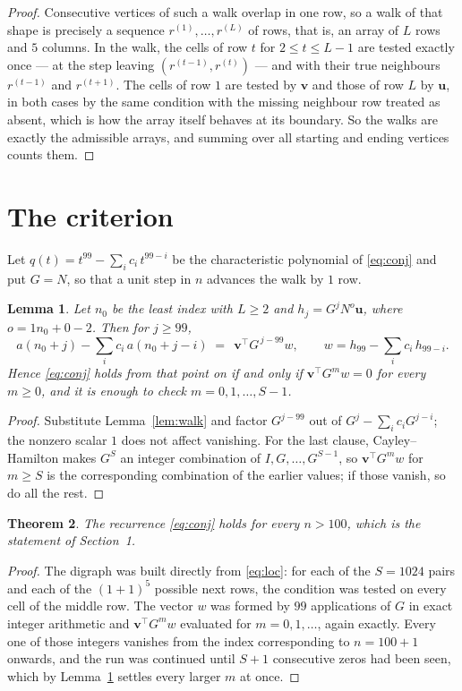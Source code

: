 \documentclass[11pt,a4paper]{article}
\theoremstyle{plain}
\newtheorem{theorem}{Theorem}
\newtheorem{lemma}[theorem]{Lemma}
\theoremstyle{definition}
\begin{document}
\begin{proof}
Consecutive vertices of such a walk overlap in one row, so a walk of that shape is
precisely a sequence $r^{(1)},\dots,r^{(L)}$ of rows, that is, an array of $L$ rows
and $5$ columns. In the walk, the cells of row $t$ for $2\le t\le L-1$ are tested
exactly once --- at the step leaving $(r^{(t-1)},r^{(t)})$ --- and with their true
neighbours $r^{(t-1)}$ and $r^{(t+1)}$. The cells of row $1$ are tested by
$\mathbf{v}$ and those of row $L$ by $\mathbf{u}$, in both cases by the same condition
with the missing neighbour row treated as absent, which is how the array itself behaves at
its boundary. So the walks are exactly the admissible arrays, and summing over all starting
and ending vertices counts them.
\end{proof}

\section{The criterion}

Let $q(t)=t^{99}-\sum_i c_i\,t^{99-i}$ be the characteristic polynomial of
\eqref{eq:conj} and put $G=N$, so that a unit step in $n$ advances the walk by
$1$ row.

\begin{lemma}\label{lem:crit}
Let $n_0$ be the least index with $L\ge2$ and $h_j=G^{j}N^{o}\mathbf{u}$, where
$o=1n_0+0-2$. Then for $j\ge99$,
\[
a(n_0+j)-\sum_i c_i\,a(n_0+j-i)\;=\;\,\mathbf{v}^{\!\top}G^{\,j-99}w,
\qquad w=h_{99}-\sum_i c_i\,h_{99-i} .
\]
Hence \eqref{eq:conj} holds from that point on if and only if
$\mathbf{v}^{\!\top}G^{m}w=0$ for every $m\ge0$, and it is enough to check
$m=0,1,\dots,S-1$.
\end{lemma}

\begin{proof}
Substitute Lemma~\ref{lem:walk} and factor $G^{j-99}$ out of
$G^{j}-\sum_ic_iG^{j-i}$; the nonzero scalar $1$ does not affect
vanishing. For the last clause, Cayley--Hamilton makes $G^{S}$ an integer combination of
$I,G,\dots,G^{S-1}$, so $\mathbf{v}^{\!\top}G^{m}w$ for $m\ge S$ is the corresponding
combination of the earlier values; if those vanish, so do all the rest.
\end{proof}

\begin{theorem}
The recurrence \eqref{eq:conj} holds for every $n>100$, which is the statement of
Section~1.
\end{theorem}

\begin{proof}
The digraph was built directly from \eqref{eq:loc}: for each of the $S=1024$ pairs and each
of the $(1+1)^{5}$ possible next rows, the condition was tested on every cell of
the middle row. The vector $w$ was formed by $99$ applications of $G$ in exact integer
arithmetic and $\mathbf{v}^{\!\top}G^{m}w$ evaluated for $m=0,1,\dots$, again exactly.
Every one of those integers vanishes from the index corresponding to $n=100+1$ onwards,
and the run was continued until $S+1$ consecutive zeros had been seen, which by
Lemma~\ref{lem:crit} settles every larger $m$ at once.
\end{proof}
\end{document}
